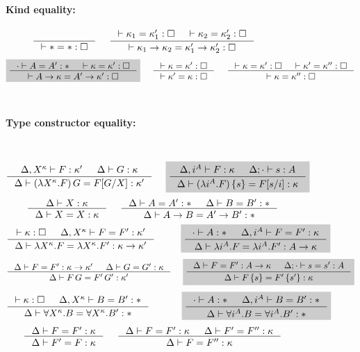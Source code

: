 \documentclass{llncs}
\newcommand{\newFi}[1]{\colorbox{grey}{\ensuremath{#1}}}
\begin{document}
\begin{figure}
\paragraph{Kind equality:} ~~ 
$
 ~~~~
   \inference{}{|- * = *:\square}
 ~~~~
   \inference{ |- \kappa_1 = \kappa_1' : \square
             & |- \kappa_2 = \kappa_2' : \square }
             {|- \kappa_1 -> \kappa_2 = \kappa_1' -> \kappa_2' : \square}
$
\[ \newFi{
   \inference{\cdot |- A=A':* & |- \kappa=\kappa':\square}
             {|- A -> \kappa = A' -> \kappa' : \square} }
 ~~~~
   \inference{|- \kappa=\kappa':\square}
             {|- \kappa'=\kappa:\square}
 ~~~~
   \inference{ |- \kappa =\kappa' :\square
             & |- \kappa'=\kappa'':\square}
             {|- \kappa=\kappa'':\square}
\]
~\\
\paragraph{Type constructor equality:} ~~ 
\[ \inference{\Delta,X^\kappa |- F:\kappa' & \Delta |- G:\kappa}
             {\Delta |- (\lambda X^\kappa.F)\,G = F[G/X]:\kappa'}
 ~~~~ \newFi{
   \inference{\Delta,i^A |- F:\kappa & \Delta;\cdot |- s:A}
             {\Delta |- (\lambda i^A.F)\,\{s\} = F[s/i]:\kappa} }
\]
\[ \inference{\Delta |- X:\kappa }{\Delta |- X=X:\kappa}
 ~~~~
   \inference{\Delta |- A=A':* & \Delta |- B=B':*}{\Delta |- A-> B=A'-> B':*}
\]
\[ \inference{|- \kappa:\square & \Delta,X^\kappa |- F=F' : \kappa'}
             {\Delta |- \lambda X^\kappa.F=\lambda X^\kappa.F':\kappa-> \kappa'}
 ~~~~ \quad ~
 \newFi{
   \inference{\cdot |- A:* & \Delta,i^A |- F=F' : \kappa}
             {\Delta |- \lambda i^A.F=\lambda i^A.F' : A -> \kappa}
     }
\]
\[ \inference{\Delta |- F=F':\kappa->\kappa' & \Delta |- G=G':\kappa}
             {\Delta |- F\,G = F'\,G' : \kappa'}
 ~~~~ \newFi{
 \inference{\Delta |- F=F':A->\kappa & \Delta;\cdot |- s=s':A}
             {\Delta |- F\,\{s\} = F'\,\{s'\} : \kappa}
     }
\]
\[
   \inference{|- \kappa:\square & \Delta,X^\kappa |- B=B':*}
             {\Delta |- \forall X^\kappa.B=\forall X^\kappa.B':*}
 ~~~~ \qquad
 \newFi{
   \inference{\cdot |- A:* & \Delta,i^A |- B=B':*}
             {\Delta |- \forall i^A.B=\forall i^A.B':*} }
\]
\[ \inference{\Delta |- F = F' : \kappa}{\Delta |- F' = F : \kappa}
 ~~~~
   \inference{\Delta |- F = F' : \kappa & \Delta |- F' = F'' : \kappa}
             {\Delta |- F = F'' : \kappa}
\]
~\\

\end{figure}
\end{document}
